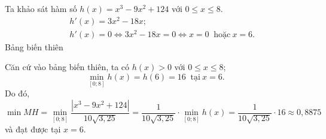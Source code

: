 \begin{bt}
{		Ta khảo sát hàm số  $h(x)=x^3-9x^2+124$ với $0\leq x\leq 8$.
		{\allowdisplaybreaks 
		\begin{eqnarray*}
			&&h'(x)=3x^2-18x;\\ 
			&&h'(x)=0\Leftrightarrow 3x^2-18x=0 \Leftrightarrow  x=0 \ \text{ hoặc} \ x= 6.
		\end{eqnarray*}}
		Bảng biến  thiên
		\begin{center}
		\end{center}
		Căn cứ vào bảng biến thiên, ta có $h(x)>0$ với $0\leq  x\leq 8$;
		$$\min\limits_{[0;8]}  h(x)=h(6)=16 \ \text{ tại}\ x=6.$$
		Do đó, $\min MH=\min\limits_{[0;8]} \dfrac{\left|x^3-9x^2+124\right|}{10\sqrt{3{,}25}}=\dfrac{1}{10\sqrt{3{,}25}}\cdot \min\limits_{[0;8]}  h(x)=\dfrac{1}{10\sqrt{3{,}25}}\cdot 16\approx0{,}8875$ và đạt được tại $x=6$.
	 }
\end{bt}

